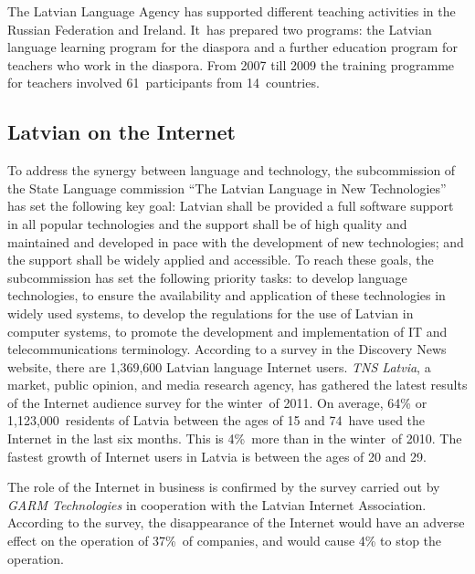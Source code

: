 \begin{multicols}{2}
The Latvian Language Agency has supported different teaching activities in the Russian Federation and Ireland.
It~has prepared two programs: the Latvian language learning program for the diaspora and a further education program for teachers who work in the diaspora.
From 2007 till 2009 the training programme for teachers involved 61~participants from 14~countries.

\subsection{Latvian on the Internet}

To address the synergy between language and technology, the subcommission of the State Language commission “The Latvian Language in New Technologies” has set the following key goal: Latvian shall be provided a full software support in all popular technologies and the support shall be of high quality and maintained and developed in pace with the development of new technologies; and the support shall be widely applied and accessible.
To reach these goals, the subcommission has set the following priority tasks: to develop language technologies, to ensure the availability and application of these technologies in widely used systems, to develop the regulations for the use of Latvian in computer systems, to promote the development and implementation of IT and telecommunications terminology.
According to a survey in the Discovery News website, there are 1,369,600 Latvian language Internet users.
\textit{TNS Latvia}, a market, public opinion, and media research agency, has gathered the latest results of the Internet audience survey for the winter~of 2011.
On average, 64\% or 1,123,000~residents of Latvia between the ages of 15 and 74~have used the Internet in the last six months.
This is 4\%~more than in the winter~of 2010.
The fastest growth of Internet users in Latvia is between the ages of 20 and 29.

The role of the Internet in business is confirmed by the survey carried out by \textit{GARM Technologies} in cooperation with the Latvian Internet Association.
According to the survey, the disappearance of the Internet would have an adverse effect on the operation of 37\%~of companies, and would cause 4\% to stop the operation.


\end{multicols}
